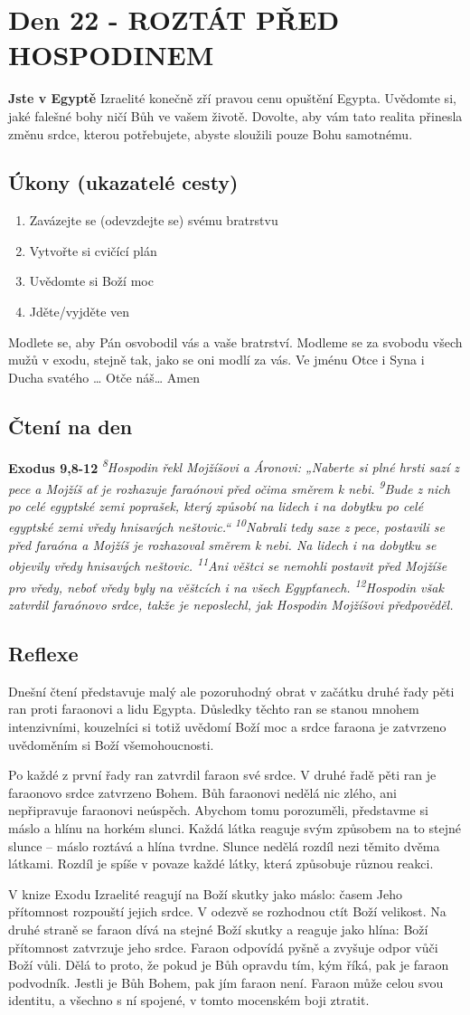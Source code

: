 \documentclass[11pt]{article}
\newcommand{\zacatekCtvrtyTyden}{
  \textbf{Jste v Egyptě} \newline
  Izraelité konečně zří pravou cenu opuštění Egypta. Uvědomte si, jaké falešné bohy ničí Bůh ve vašem životě.
Dovolte, aby vám tato realita přinesla změnu srdce, kterou potřebujete, abyste sloužili pouze Bohu samotnému.

\subsection*{Úkony (ukazatelé cesty)}
\begin{enumerate}
  \item Zavázejte se (odevzdejte se) svému bratrstvu
  \item Vytvořte si cvičící plán
  \item Uvědomte si Boží moc
  \item Jděte/vyjděte ven
\end{enumerate}
Modlete se, aby Pán osvobodil vás a vaše bratrství. \newline
Modleme se za svobodu všech mužů v exodu, stejně tak, jako se oni modlí za vás.\newline
Ve jménu Otce i Syna i Ducha svatého …  Otče náš… Amen
}
\begin{document}
\newpage
\section{Den 22 - ROZTÁT PŘED HOSPODINEM}
\zacatekCtvrtyTyden
\subsection*{Čtení na den}
\textbf{Exodus 9,8-12}
\newline
\textit{
\textsuperscript{8}Hospodin řekl Mojžíšovi a Áronovi: „Naberte si plné hrsti sazí z pece a Mojžíš ať je rozhazuje faraónovi před očima směrem k nebi.
\textsuperscript{9}Bude z nich po celé egyptské zemi poprašek, který způsobí na lidech i na dobytku po celé egyptské zemi vředy hnisavých neštovic.“
\textsuperscript{10}Nabrali tedy saze z pece, postavili se před faraóna a Mojžíš je rozhazoval směrem k nebi. Na lidech i na dobytku se objevily vředy hnisavých neštovic.
\textsuperscript{11}Ani věštci se nemohli postavit před Mojžíše pro vředy, neboť vředy byly na věštcích i na všech Egypťanech.
\textsuperscript{12}Hospodin však zatvrdil faraónovo srdce, takže je neposlechl, jak Hospodin Mojžíšovi předpověděl.
}

\subsection*{Reflexe}

Dnešní čtení představuje malý ale pozoruhodný obrat v začátku druhé řady pěti ran proti faraonovi a lidu Egypta.
Důsledky těchto ran se stanou mnohem intenzivními, kouzelníci si totiž uvědomí Boží moc a srdce faraona je
zatvrzeno uvědoměním si Boží všemohoucnosti.

Po každé z první řady ran zatvrdil faraon své srdce. V druhé řadě pěti ran je faraonovo srdce zatvrzeno Bohem. Bůh
faraonovi nedělá nic zlého, ani nepřipravuje faraonovi neúspěch. Abychom tomu porozuměli, představme si máslo
a hlínu na horkém slunci. Každá látka reaguje svým způsobem na to stejné slunce – máslo roztává a hlína tvrdne.
Slunce nedělá rozdíl nezi těmito dvěma látkami. Rozdíl je spíše v povaze každé látky, která způsobuje různou
reakci.

V knize Exodu Izraelité reagují na Boží skutky jako máslo: časem Jeho přítomnost rozpouští jejich srdce. V odezvě
se rozhodnou ctít Boží velikost. Na druhé straně se faraon dívá na stejné Boží skutky a reaguje jako hlína: Boží
přítomnost zatvrzuje jeho srdce. Faraon odpovídá pyšně a zvyšuje odpor vůči Boží vůli. Dělá to proto, že pokud je
Bůh opravdu tím, kým říká, pak je faraon podvodník. Jestli je Bůh Bohem, pak jím faraon není. Faraon může celou
svou identitu, a všechno s ní spojené, v tomto mocenském boji ztratit.
\end{document}
